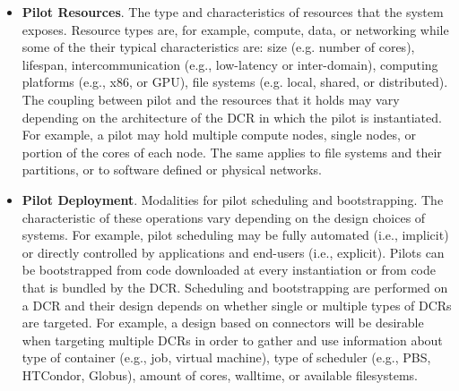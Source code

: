 \documentclass{sig-alternate}
\begin{document}
\begin{itemize}

\item \textbf{Pilot Resources}. The type and characteristics of resources that
  the \pilot system exposes. Resource types are, for example, compute, data, or
  networking while some of the their typical characteristics are: size (e.g.
  number of cores), lifespan, intercommunication (e.g., low-latency or
  inter-domain), computing platforms (e.g., x86, or GPU), file systems (e.g.
  local, shared, or distributed). The coupling between pilot and the resources
  that it holds may vary depending on the architecture of the DCR in which the
  pilot is instantiated. For example, a pilot may hold multiple compute nodes,
  single nodes, or portion of the cores of each node. The same applies to file
  systems and their partitions, or to software defined or physical networks.



\item \textbf{Pilot Deployment}. Modalities for pilot scheduling and
  bootstrapping. The characteristic of these operations vary depending on the
  design choices of \pilot systems. For example, pilot scheduling may be fully
  automated (i.e., implicit) or directly controlled by applications and
  end-users (i.e., explicit). Pilots can be bootstrapped from code downloaded at
  every instantiation or from code that is bundled by the DCR. Scheduling and
  bootstrapping are performed on a DCR and their design depends on whether
  single or multiple types of DCRs are targeted. For example, a design based on
  connectors will be desirable when targeting multiple DCRs in order to gather
  and use information about type of container (e.g., job, virtual machine), type
  of scheduler (e.g., PBS, HTCondor, Globus), amount of cores, walltime, or
  available filesystems.




\end{itemize}
\end{document}
